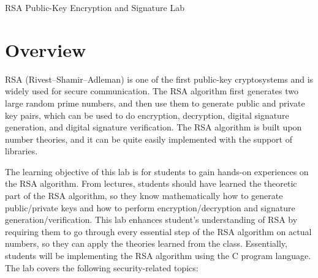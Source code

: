 
\newcommand{\commonfolder}{../../common-files}









\begin{center}
{\LARGE RSA Public-Key Encryption and Signature Lab}
\end{center}




\section{Overview}

RSA (Rivest–Shamir–Adleman) is one of the first public-key cryptosystems
and is widely used for secure communication. 
The RSA algorithm first generates two large random prime numbers, 
and then use them to generate public and private key pairs, which can be
used to do encryption, decryption, digital signature generation, 
and digital signature verification. The RSA algorithm is built upon 
number theories, and it can be quite easily implemented with the support of
libraries. 


The learning objective of this lab is for students to gain hands-on experiences on
the RSA algorithm. From lectures, students should have learned the 
theoretic part of the RSA algorithm, so they know 
mathematically how to generate public/private keys and 
how to perform encryption/decryption and signature generation/verification. 
This lab enhances student's understanding of RSA 
by requiring them to go through every essential step of the RSA algorithm
on actual numbers, so they can apply the theories learned from the class. 
Essentially, students will be implementing the RSA algorithm using 
the C program language. The lab covers the following security-related topics:

